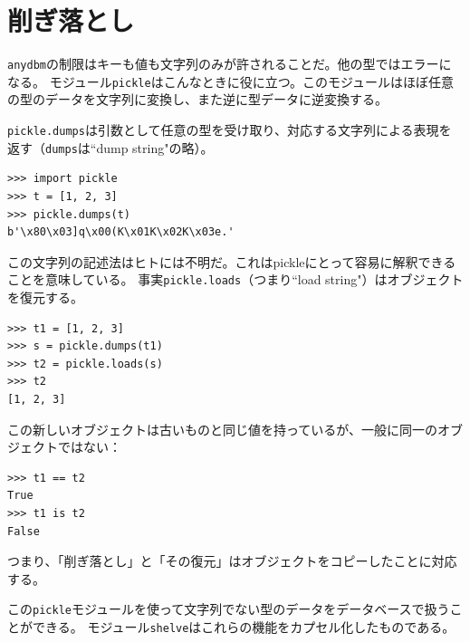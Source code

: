 \documentclass[a4j,12pt,makeidx]{jbook}
\begin{document}
\section{削ぎ落とし}
{\tt anydbm}の制限はキーも値も文字列のみが許されることだ。他の型ではエラーになる。
モジュール{\tt pickle}はこんなときに役に立つ。このモジュールはほぼ任意の型のデータを文字列に変換し、また逆に型データに逆変換する。\par
{\tt pickle.dumps}は引数として任意の型を受け取り、対応する文字列による表現を返す（{\tt dumps}は``dump string"の略）。
\begin{verbatim}
>>> import pickle
>>> t = [1, 2, 3]
>>> pickle.dumps(t)
b'\x80\x03]q\x00(K\x01K\x02K\x03e.'
\end{verbatim}
この文字列の記述法はヒトには不明だ。これはpickleにとって容易に解釈できることを意味している。
事実{\tt pickle.loads}（つまり``load string"）はオブジェクトを復元する。
\begin{verbatim}
>>> t1 = [1, 2, 3]
>>> s = pickle.dumps(t1)
>>> t2 = pickle.loads(s)
>>> t2
[1, 2, 3]
\end{verbatim}
この新しいオブジェクトは古いものと同じ値を持っているが、一般に同一のオブジェクトではない：
\begin{verbatim}
>>> t1 == t2
True
>>> t1 is t2
False
\end{verbatim}
つまり、「削ぎ落とし」と「その復元」はオブジェクトをコピーしたことに対応する。\par
この{\tt pickle}モジュールを使って文字列でない型のデータをデータベースで扱うことができる。
モジュール{\tt shelve}はこれらの機能をカプセル化したものである。
%
\end{document}
